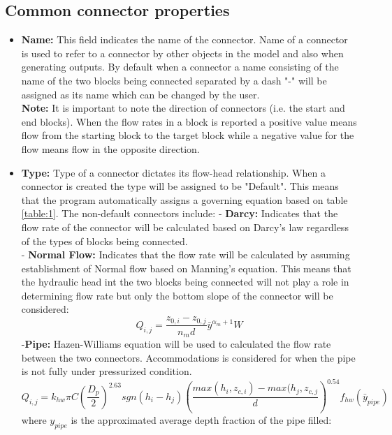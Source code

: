 \subsection{Common connector properties}
\begin{itemize}
    \item \textbf{Name: } This field indicates the name of the connector. Name of a connector is used to refer to a connector by other objects in the model and also when generating outputs. By default when a connector a name consisting of the name of the two blocks being connected separated by a dash "-" will be assigned as its name which can be changed by the user. \\
    \textbf{Note: } It is important to note the direction of  connectors (i.e. the start and end blocks). When the flow rates in a block is reported a positive value means flow from the starting block to the target block while a negative value for the flow means flow in the opposite direction. 
    \item \textbf{Type: } Type of a connector dictates its flow-head relationship. When a connector is created the type will be assigned to be "Default". This means that the program automatically assigns a governing equation based on table \ref{table:1}. The non-default connectors include: 
    - \textbf{Darcy: } Indicates that the flow rate of the connector will be calculated based on Darcy's law regardless of the types of blocks being connected. \\
    - \textbf{Normal Flow: } Indicates that the flow rate will be calculated by assuming establishment of Normal flow based on Manning's equation. This means that the hydraulic head int the two blocks being connected will not play a role in determining flow rate but only the bottom slope of the connector will be considered:
    \begin{equation}
    \label{eq:8}
    Q_{i,j}=\frac{z_{0,i}-z_{0,j}}{n_m d}\bar{y}^{\alpha_m+1}W
    \end{equation}
    -\textbf{Pipe: } Hazen-Williams equation will be used to calculated the flow rate between the two connectors. Accommodations is considered for when the pipe is not fully under pressurized condition. 
    \begin{equation}
    \label{eq:9}
    Q_{i,j}=k_{hw}\pi C (\frac{D_p}{2})^{2.63} sgn(h_i-h_j) (\frac{max(h_i,z_{c,i})-max(h_j,z_{c,j}}{d})^{0.54} f_{hw}(\bar{y}_{pipe})
    \end{equation}
    where $y_{pipe}$ is the approximated average depth fraction of the pipe filled: 

\end{itemize}
